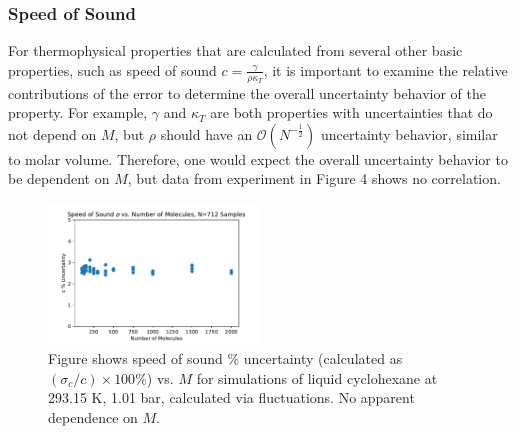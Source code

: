 \documentclass[9pt,bestpractices]{livecoms}
\begin{document}
\subsubsection{Speed of Sound}
For thermophysical properties that are calculated from several other basic properties, such as speed of sound $c=\frac{\gamma}{\rho \kappa_T}$, it is important to examine the relative contributions of the error to determine the overall uncertainty behavior of the property.  For example, $\gamma$ and $\kappa_T$ are both properties with uncertainties that do not depend on $M$, but $\rho$ should have an $\mathcal{O}(N^{-\frac{1}{2}})$ uncertainty behavior, similar to molar volume.  Therefore, one would expect the overall uncertainty behavior to be dependent on $M$, but data from experiment in Figure 4 shows no correlation. 
\begin{figure}[H]
\includegraphics[width=0.5\textwidth]{c_stdev_vs_number_of_molecules.pdf}
\caption{Figure shows speed of sound \% uncertainty (calculated as $(\sigma_{c}/c) \times 100 \%$) vs. $M$ for simulations of liquid cyclohexane at 293.15 K, 1.01 bar, calculated via fluctuations. No apparent dependence on $M$.} 
\end{figure}
\end{document}
